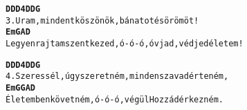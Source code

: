 \cleardoublepage
{}
\kottastart
{}
\kottaend
\begin{minipage}{\textwidth}
\begin{alltt}
\textbf{   D                   D D4 D  D             G}
3. Uram, mindent köszönök,    bánatot és örömöt!
\textbf{    Em                    G       A                    D}
   Legyen rajtam szent kezed, ó-ó-ó, óvjad, védjed életem!
\end{alltt}
\vspace{0.0cm}
\versszakspacing
\end{minipage}
\begin{minipage}{\textwidth}
\begin{alltt}
\textbf{    D                    D D4 D   D                 G}
4. Szeressél, úgy szeretném,     minden szavad érteném,
\textbf{   Em              G G     A                     D}
   Életemben követném, ó-ó-ó, végül Hozzád érkezném.
\end{alltt}
\vspace{0.0cm}
\versszakspacing
\end{minipage}
~\vspace{1.0cm}
\newline
